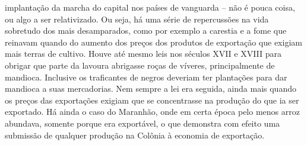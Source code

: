 implantação da marcha do capital nos países de vanguarda -- não é pouca
coisa, ou algo a ser relativizado. Ou seja, há uma série de repercussões
na vida sobretudo dos mais desamparados, como por exemplo a carestia e a
fome que reinavam quando do aumento dos preços dos produtos de
exportação que exigiam mais terras de cultivo. Houve até mesmo leis nos
séculos XVII e XVIII para obrigar que parte da lavoura abrigasse roças
de víveres, principalmente de mandioca. Inclusive os traficantes de
negros deveriam ter plantações para dar mandioca a suas mercadorias. Nem
sempre a lei era seguida, ainda mais quando os preços das exportações
exigiam que se concentrasse na produção do que ia ser exportado. Há
ainda o caso do Maranhão, onde em certa época pelo menos arroz abundava,
somente porque era exportável, o que demonstra com efeito uma submissão
de qualquer produção na Colônia à economia de exportação.

